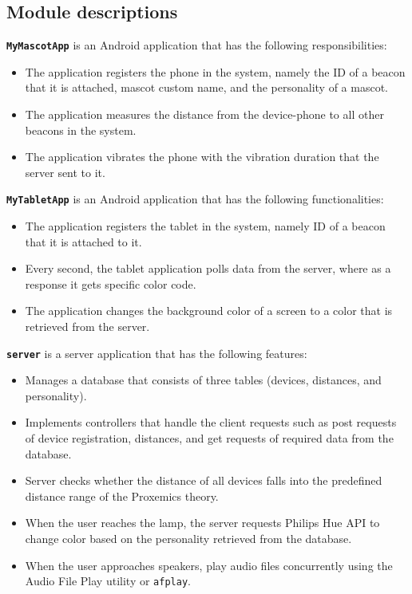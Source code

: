 \subsection{Module descriptions}
\label{subsec:module-descriptions}
\textbf{\texttt{MyMascotApp}} is an Android application that has the following responsibilities:
\begin{itemize}
    \item The application registers the phone in the system, namely the ID of a beacon that it is attached,
    mascot custom name, and the personality of a mascot.
    \item The application measures the distance from the device-phone to all other beacons in the system.
    \item The application vibrates the phone with the vibration duration that the server sent to it.
\end{itemize}

\textbf{\texttt{MyTabletApp}} is an Android application that has the following functionalities:
\begin{itemize}
    \item The application registers the tablet in the system, namely ID of a beacon that it is attached to it.
    \item Every second, the tablet application polls data from the server, where as a response it gets specific color code.
    \item The application changes the background color of a screen to a color that is retrieved from the server.
\end{itemize}

\textbf{\texttt{server}} is a server application that has the following features:
\begin{itemize}
    \item Manages a database that consists of three tables (devices, distances, and personality).
    \item Implements controllers that handle the client requests such as post requests of device registration,
    distances, and get requests of required data from the database.
    \item Server checks whether the distance of all devices falls into the predefined distance range of the Proxemics theory.
    \item When the user reaches the lamp, the server requests Philips Hue API to change color based on the personality retrieved from the database.
    \item When the user approaches speakers, play audio files concurrently using the Audio File Play
    utility or \texttt{afplay}.
\end{itemize}

